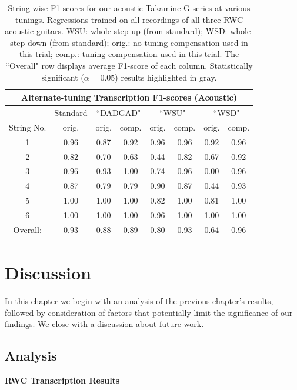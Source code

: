 \documentclass[12pt]{cmuthesis}
\begin{document}
\begin{table}[!htbp]
\begin{center}
\begin{tabular}{||c||c||c|c||c|c||c|c||}
\hline
\multicolumn{8}{|c|}{\bf{Alternate-tuning Transcription F1-scores (Acoustic)}} \\
\hline
& Standard & \multicolumn{2}{|c|}{``DADGAD"} & \multicolumn{2}{|c|}{``WSU"} & \multicolumn{2}{|c|}{``WSD"} \\
\hline
String No. & orig. & orig. & comp. & orig. & comp. & orig. & comp. \\
\hline
1 & 0.96 & 0.87 & 0.92 & 0.96 & 0.96 & 0.92 & 0.96 \\
\hline
2 & 0.82 & 0.70 & 0.63 & 0.44 & 0.82 & 0.67 & 0.92\\
\hline
3 & 0.96 & 0.93 & 1.00 & 0.74 & 0.96 & 0.00 & 0.96\\
\hline
4 & 0.87 & 0.79 & 0.79 & 0.90 & 0.87 & 0.44 & 0.93 \\
\hline
5 & 1.00 & 1.00 & 1.00 & 0.82 & 1.00 & 0.81 & 1.00 \\
\hline
6 & 1.00 & 1.00 & 1.00 & 0.96 & 1.00 & 1.00 & 1.00\\ 
\hline
\hline
Overall: & 0.93 & 0.88 & 0.89 & \cellcolor[gray]{0.8}0.80 & \cellcolor[gray]{0.8}0.93 & \cellcolor[gray]{0.8}0.64 & \cellcolor[gray]{0.8}0.96\\
\hline
\end{tabular}
\caption{String-wise F1-scores for our acoustic Takamine G-series at various tunings. Regressions trained on all recordings of all three RWC acoustic guitars. WSU: whole-step up (from standard); WSD: whole-step down (from standard); orig.: no tuning compensation used in this trial; comp.: tuning compensation used in this trial. The ``Overall" row displays average F1-score of each column. Statistically significant ($\alpha=0.05$) results highlighted in gray.} 
\label{tab:results-ag-tune}
\end{center}
\end{table}

\noindent
\chapter{Discussion}
\label{chap:discussion}
In this chapter we begin with an analysis of the previous chapter's results, followed by consideration of factors that potentially limit the significance of our findings. We close with a discussion about future work.

\section{Analysis}
\textbf{RWC Transcription Results}
\end{document}
